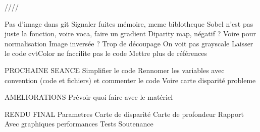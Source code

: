 \documentclass{article}
\begin{document}
////

Pas d'image dans git
Signaler fuites mémoire, meme biblotheque
Sobel n'est pas juste la fonction, voire voca, faire un gradient
Diparity map, négatif ?
Voire pour normalisation
Image inversée ?
Trop de découpage 
On voit pas grayscale
Laisser le code cvtColor ne faccilite pas le code
Mettre plus de références

PROCHAINE SEANCE
Simplifier le code
Rennomer les variables avec convention (code et fichiers) et commenter le code
Voire carte disparité probleme


AMELIORATIONS
Prévoir quoi faire avec le matériel

RENDU FINAL
Parametres
Carte de disparité
Carte de profondeur
Rapport
Avec graphiques performances
Tests
Soutenance


\newpage
\end{document}
